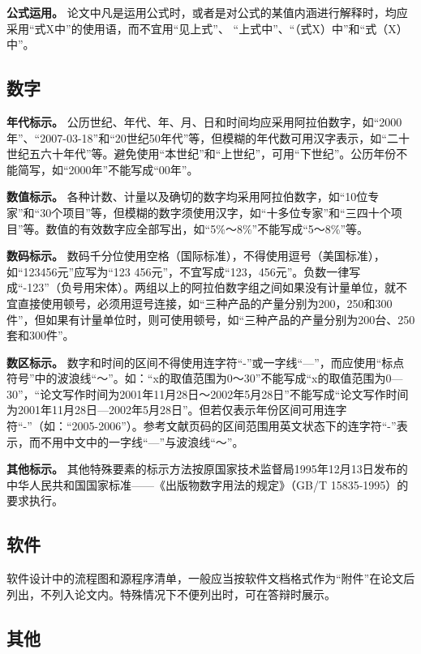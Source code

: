 \documentclass[singlesided]{Style/ucasthesis}%
\begin{document}
\textbf{公式运用。} 论文中凡是运用公式时，或者是对公式的某值内涵进行解释时，均应采用``式X中''的使用语，而不宜用``见上式''、 ``上式中''、``（式X）中''和``式（X）中''。

\hypertarget{section-29}{%
\subsection{数字}\label{section-29}}

\textbf{年代标示。} 公历世纪、年代、年、月、日和时间均应采用阿拉伯数字，如``2000年''、``2007-03-18''和``20世纪50年代''等，但模糊的年代数可用汉字表示，如``二十世纪五六十年代''等。避免使用``本世纪''和``上世纪''，可用``下世纪''。公历年份不能简写，如``2000年''不能写成``00年''。

\textbf{数值标示。} 各种计数、计量以及确切的数字均采用阿拉伯数字，如``10位专家''和``30个项目''等，但模糊的数字须使用汉字，如``十多位专家''和``三四十个项目''等。数值的有效数字应全部写出，如``5\%～8\%''不能写成``5～8\%''等。

\textbf{数码标示。} 数码千分位使用空格（国际标准），不得使用逗号（美国标准），如``123456元''应写为``123 456元''，不宜写成``123，456元''。负数一律写成``-123''（负号用宋体）。两组以上的阿拉伯数字组之间如果没有计量单位，就不宜直接使用顿号，必须用逗号连接，如``三种产品的产量分别为200，250和300件''，但如果有计量单位时，则可使用顿号，如``三种产品的产量分别为200台、250套和300件''。

\textbf{数区标示。} 数字和时间的区间不得使用连字符``-''或一字线``---''，而应使用``标点符号''中的波浪线``～''。如：``x的取值范围为0～30''不能写成``x的取值范围为0---30''，``论文写作时间为2001年11月28日～2002年5月28日''不能写成``论文写作时间为2001年11月28日---2002年5月28日''。但若仅表示年份区间可用连字符``-''（如：``2005-2006''）。参考文献页码的区间范围用英文状态下的连字符``-''表示，而不用中文中的一字线``---''与波浪线``～''。

\textbf{其他标示。} 其他特殊要素的标示方法按原国家技术监督局1995年12月13日发布的中华人民共和国国家标准------《出版物数字用法的规定》（GB/T 15835-1995）的要求执行。

\hypertarget{section-30}{%
\subsection{软件}\label{section-30}}

软件设计中的流程图和源程序清单，一般应当按软件文档格式作为``附件''在论文后列出，不列入论文内。特殊情况下不便列出时，可在答辩时展示。

\hypertarget{section-31}{%
\subsection{其他}\label{section-31}}
\end{document}
